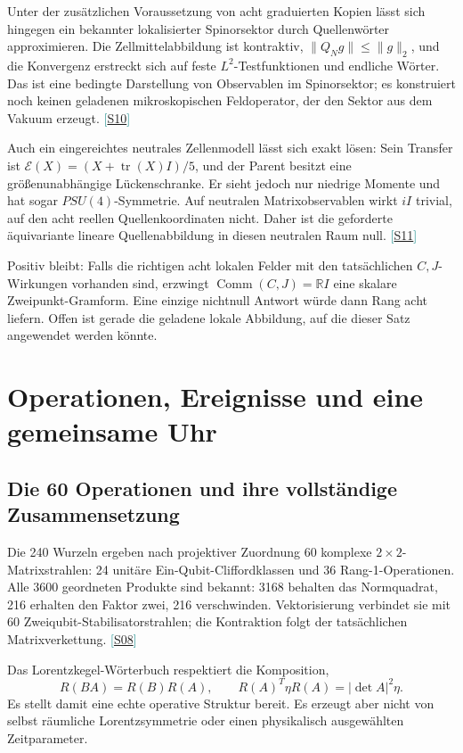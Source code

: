 \documentclass[11pt,a4paper,oneside,parskip=half,headings=normal,numbers=noenddot,bibliography=totoc]{scrreprt}
\newcommand{\R}{\mathbb R}
\newcommand{\tr}{\operatorname{tr}}
\newcommand{\src}[1]{\textcolor{teal}{\small[\hyperref[s:#1]{S#1}]}}
\begin{document}
Unter der zusätzlichen Voraussetzung von acht graduierten Kopien lässt sich hingegen ein bekannter lokalisierter Spinorsektor durch Quellenwörter approximieren. Die Zellmittelabbildung ist kontraktiv, $\|Q_Ng\|\le\|g\|_2$, und die Konvergenz erstreckt sich auf feste $L^2$-Testfunktionen und endliche Wörter. Das ist eine bedingte Darstellung von Observablen im Spinorsektor; es konstruiert noch keinen geladenen mikroskopischen Feldoperator, der den Sektor aus dem Vakuum erzeugt. \src{10}

Auch ein eingereichtes neutrales Zellenmodell lässt sich exakt lösen: Sein Transfer ist $\mathcal E(X)=(X+\tr(X)I)/5$, und der Parent besitzt eine größenunabhängige Lückenschranke. Er sieht jedoch nur niedrige Momente und hat sogar $PSU(4)$-Symmetrie. Auf neutralen Matrixobservablen wirkt $iI$ trivial, auf den acht reellen Quellenkoordinaten nicht. Daher ist die geforderte äquivariante lineare Quellenabbildung in diesen neutralen Raum null. \src{11}

Positiv bleibt: Falls die richtigen acht lokalen Felder mit den tatsächlichen $C,J$-Wirkungen vorhanden sind, erzwingt $\operatorname{Comm}(C,J)=\R I$ eine skalare Zweipunkt-Gramform. Eine einzige nichtnull Antwort würde dann Rang acht liefern. Offen ist gerade die geladene lokale Abbildung, auf die dieser Satz angewendet werden könnte.

\chapter{Operationen, Ereignisse und eine gemeinsame Uhr}
\section{Die 60 Operationen und ihre vollständige Zusammensetzung}
Die 240 Wurzeln ergeben nach projektiver Zuordnung 60 komplexe $2\times2$-Matrixstrahlen: 24 unitäre Ein-Qubit-Cliffordklassen und 36 Rang-1-Operationen. Alle 3600 geordneten Produkte sind bekannt: 3168 behalten das Normquadrat, 216 erhalten den Faktor zwei, 216 verschwinden. Vektorisierung verbindet sie mit 60 Zweiqubit-Stabilisatorstrahlen; die Kontraktion folgt der tatsächlichen Matrixverkettung. \src{08}

Das Lorentzkegel-Wörterbuch respektiert die Komposition,
\[
 R(BA)=R(B)R(A),\qquad
 R(A)^T\eta R(A)=|\det A|^2\eta.
\]
Es stellt damit eine echte operative Struktur bereit. Es erzeugt aber nicht von selbst räumliche Lorentzsymmetrie oder einen physikalisch ausgewählten Zeitparameter.
\end{document}
